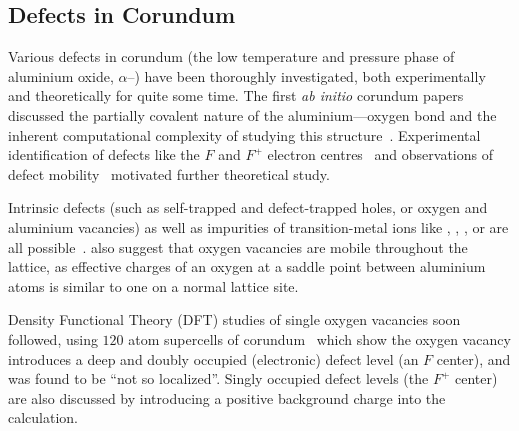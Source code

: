 \subsection{Defects in Corundum}\label{sec:cordef}
Various defects in corundum (the low temperature and pressure phase of aluminium oxide, $\alpha$--) have been thoroughly investigated, both experimentally and theoretically for quite some time.
The first \emph{ab initio} corundum papers discussed the partially covalent nature of the aluminium---oxygen bond and the inherent computational complexity of studying this structure~\cite{Causa1987}.
Experimental identification of defects like the $F$
and $F^+$ electron centres~\cite{Kotomin1989} and observations of defect mobility~\cite{Kulis1991} motivated further theoretical study.

Intrinsic defects (such as self-trapped and defect-trapped holes, or oxygen and aluminium vacancies) as well as impurities of transition-metal ions like , , ,  or  are all possible~\cite{Jacobs1994}.
\citeauthor{Jacobs1994} also suggest that oxygen vacancies are mobile throughout the lattice, as effective charges of an oxygen at a saddle point between aluminium atoms is similar to one on a normal lattice site.

Density Functional Theory (DFT) studies of single oxygen vacancies soon followed, using $120$ atom supercells of corundum~\cite{Xu1997} which show the oxygen vacancy introduces a deep and doubly occupied (electronic) defect level (an $F$ center), and was found to be ``not so localized''.
Singly occupied defect levels (the $F^+$ center) are also discussed by introducing a positive background charge into the calculation.

